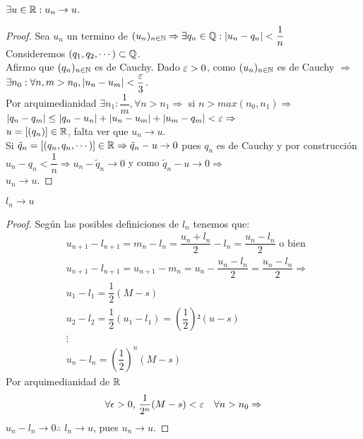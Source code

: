 \begin{lemma}
  \(\exists u \in \mathbb{R} : u_n \to u\).
  \begin{proof}
    Sea \(u_n\) un termino de \((u_n)_{n \in \mathbb{N}} \Rightarrow \exists q_n \in \mathbb{Q} : |u_n - q_n| < \dfrac{1}{n}\) \\
    Consideremos \((q_1, q_2, \cdots) \subset \mathbb{Q}\). \\
    Afirmo que \((q_n)_{n \in \mathbb{N}}\) es de Cauchy. Dado \(\varepsilon > 0\), como \((u_n)_{n \in \mathbb{N}}\) es de Cauchy \(\Rightarrow\) \\
    \(\exists n_0 : \forall n, m > n_0, |u_n - u_m| < \dfrac{\varepsilon}{3}\). \\
    Por arquimedianidad \(\exists n_1 : \dfrac{1}{m}, \forall n > n_1 \Rightarrow\) si \(n > max(n_0, n_1) \Rightarrow\) \\
    \(|q_n - q_m| \leq |q_n - u_n| + |u_n - u_m| + |u_m - q_m| < \varepsilon \Rightarrow\) \\
    \(u = [(q_n)] \in \mathbb{R}\), falta ver que \(u_n \to u\). \\
    Si \(\tilde{q}_n = [(q_n, q_n, \cdots)] \in \mathbb{R} \Rightarrow \tilde{q}_n - u \to 0\) pues \(q_n\) es de Cauchy y por construcción \(u_n - q_n < \dfrac{1}{n} \Rightarrow u_n - \tilde{q}_n \to 0\) y como \(\tilde{q}_n - u \to 0 \Rightarrow\) \\
    \(u_n \to u\).
  \end{proof}
\end{lemma}

\begin{lemma}
  \(l_n \to u\)
  \begin{proof}
    Según las posibles definiciones de \(l_n\) tenemos que: \begin{align*}
       & u_{n+1} - l_{n+1} = m_n - l_n = \dfrac{u_n+l_n}{2} - l_n = \dfrac{u_n-l_n}{2} \text{ o bien }     \\
       & u_{n+1} - l_{n+1} = u_{n+1} - m_n = u_n - \dfrac{u_n - l_n}{2} = \dfrac{u_n - l_n}{2} \Rightarrow \\
       & u_1 - l_1 = \dfrac{1}{2} (M-s)                                                                    \\
       & u_2 - l_2 = \dfrac{1}{2} (u_1 - l_1) = (\dfrac{1}{2})² (u - s)                                    \\
       & \vdots                                                                                            \\
       & u_n - l_n = (\dfrac{1}{2})^n (M - s)
    \end{align*}
    Por arquimedianidad de \(\mathbb{R}\) \begin{align*}
      \forall \epsilon > 0\text{, } \dfrac{1}{2^n} (M - s) < \varepsilon \quad \forall n > n_0 \Rightarrow
    \end{align*}
    \(u_n - l_n \to 0 \therefore\) \(l_n \to u\), pues \(u_n \to u\).
  \end{proof}
\end{lemma}

